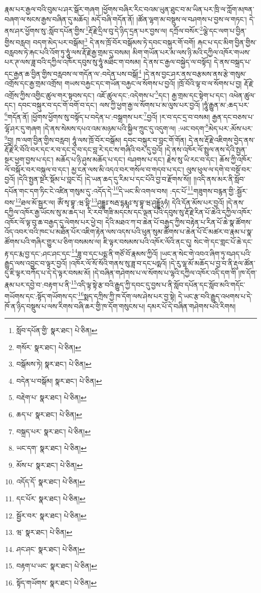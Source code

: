 རྣམ་པར་རྒྱལ་བའི་བུམ་པ་ཤར་སྒོར་གཞག །ཕྱོགས་བཞིར་རིང་བའམ་ཡུན་ཐུང་བ་མ་ཡིན་པར་ཁྲི་ལ་ཀློག་མཁན་བཞག་ལ་སངས་རྒྱས་བཞིན་དུ་མཆོད། མདོ་བཞི་གདོན་ནོ། །ཚོན་ལྷག་མ་བསྡུས་ལ་བཤགས་པ་བྱས་ལ་གཏང་། དེ་ནས་ཤར་ཕྱོགས་སུ་:སློབ་དཔོན་གྱིས་\footnote{སློབ་དཔོན་གྱི་  སྣར་ཐང་།  པེ་ཅིན། }རྡོ་རྗེ་དྲིལ་བུ་དེ་ཉིད་དྲན་པར་བྱས་ལ། དཀྲོལ་བསོར་\footnote{གསོར་  སྣར་ཐང་།  པེ་ཅིན། }ལྕེ་དང་ལག་པ་བྱིན་གྱིས་བརླབ། བདག་མེད་པར་བསྒོམ།\footnote{བསྒོམས་ཏེ།  སྣར་ཐང་།  པེ་ཅིན། } དེ་ནས་ཁྲོ་བོར་བསྒོམས་ཏེ་དབང་བསྐུར་གོ་བགོ། རྐང་པ་དང་མིག་བྱིན་གྱིས་བརླབས་ཏེ་རྐང་པའི་འོག་ཏུ་ཧཱུཾ་ལས་རྡོ་རྗེ་རྒྱ་གྲམ་དུ་བསམ། མིག་གཡོན་པར་མ་ལས་ཉི་མའི་དཀྱིལ་འཁོར་གཡས་པར་ཊ་ལས་ཟླ་བའི་དཀྱིལ་འཁོར་དབུས་སུ་ཧཱུཾ་མཐིང་ག་བསམ། དེ་ནས་ང་རྒྱལ་བསྐྱེད་ལ་བསྟོད། དེ་ནས་བསྐྲད་པ་དང་རྒྱན་ཆ་བྱིན་གྱིས་བརླབས་ལ་གདོན་ལ་:བདེན་པས་བསྒོ།\footnote{བདེན་པ་བསྒོམ།  སྣར་ཐང་།  པེ་ཅིན། } །དེ་ནས་བྱང་ཤར་ནས་བརྩམས་ནས་རྩེ་གསུམ་འགྲོས་དང་རྒྱ་གྲམ་འགྲོས། གཡས་བརྐྱང་དང་གཡོན་བརྐྱང་ལ་སོགས་པ་བྱའོ། །ཁྲོ་བོའི་ལྟ་བ་ལ་སོགས་པ་བྱ། རྡོ་རྗེ་འགྲོས་ཀྱིས་འགྱིང་ཚུལ་གར་སྟབས་དང་། འཇོ་ཚུལ་དང་:འདེགས་པ་\footnote{བརྡེག་པ་  སྣར་ཐང་།  པེ་ཅིན། }དང་། རྒྱ་གྲམ་དང་སྟེག་པ་དང་། འཕེན་ཚུལ་དང་། དབང་བསྐུར་བ་དང་གོ་བགོ་བ་དང་། ལས་ཀྱི་ཕྱག་རྒྱ་ལ་སོགས་པ་མ་ལུས་པར་བྱའོ། །ཧཱུཾ་རྒྱུན་མ་:ཆད་པར་\footnote{ཆད་པ་  སྣར་ཐང་།  པེ་ཅིན། }གདོན་ནོ། །ཕྱོགས་ཕྱོགས་སུ་བསྟོད་པ་བདེན་པ་:བསྒྲགས་པར་\footnote{བསྐྲད་པར་  སྣར་ཐང་།  པེ་ཅིན། }བྱའོ། །ར་བ་དང་དྲ་བ་བསམ། རྒྱན་དང་བཅས་པ་ལྷོ་ཤར་དུ་གཞག །དེ་ནས་སེམས་དཔའ་འམ་མཉམ་པའི་སྐྱིལ་ཀྲུང་དུ་འདུག་ལ། :ཡང་བདག་\footnote{ཡང་དག་  སྣར་ཐང་།  པེ་ཅིན། }མེད་པར་:མོས་པར་\footnote{མོས་པ་  སྣར་ཐང་།  པེ་ཅིན། }བྱ། ཁ་ལག་བྱིན་གྱིས་བརླབ། ཧཱུཾ་ལས་ཁྲོ་བོར་བསྒོམ། དབང་བསྐུར་བ་བླང་གོ་གོན། དེ་ནས་རྡོ་རྗེ་འཇིགས་བྱེད་ནས་རྡོ་རྗེ་རི་བོའི་བར་དང་ར་བ་དང་དྲ་བ་དང་བླ་རེ་དང་ས་གཞིའི་བར་དུ་བྱའོ། །དེ་ནས་འཁོར་ལོ་སྤྲུལ་ནས་དེའི་སྤྱན་སྔར་ཕྱག་བྱས་པ་དང་། མཆོད་པ་ཉི་ཤུས་མཆོད་པ་དང་། བཤགས་པ་དང་། རྗེས་སུ་ཡི་རང་བ་དང་། ཆོས་ཀྱི་འཁོར་ལོ་བསྐོར་བར་བསྐུལ་བ་དང་། མྱ་ངན་ལས་མི་འདའ་བར་གསོལ་བ་གདབ་པ་དང་། ལུས་ཕུལ་ལ་དགེ་བ་བསྔོ་བར་བྱའོ། །དེའི་སྤྱན་སྔར་སྡོམ་པ་བླང་ངོ། །དེ་ཡན་ཆད་དུ་རིམ་པ་དང་པོའི་བྱ་བ་རྫོགས་སོ།། །།འདི་ནས་མར་ནི་སློབ་དཔོན་གང་དག་ཏིང་ངེ་འཛིན་གསུམ་དུ་:འདོད་དེ་\footnote{འདོད་དོ་  སྣར་ཐང་།  པེ་ཅིན། }དེ་ཡང་མི་འགལ་བས། :དང་པོ་\footnote{དང་པོར་  སྣར་ཐང་།  པེ་ཅིན། }གཟུགས་བརྙན་གྱི་:སྦྱོར་བས་\footnote{སྦྱོར་བར་  སྣར་ཐང་།  པེ་ཅིན། }ཐལ་མོ་སྦྱར་ལ། ཨོཾ་སྭ་བྷཱ་:ཝ་བྷི་\footnote{ཝ་  སྣར་ཐང་།  པེ་ཅིན། }ཤུདྡྷཿ་སརྦ་དྷརྨཱཿ་སྭ་བྷཱ་ཝ་ཤུདྡྷོ྅ཧཾ། དེའི་དོན་མོས་པར་བྱའོ། །དེ་ནས་དཀྱིལ་འཁོར་རྒྱ་ཡོངས་སུ་མ་ཆད་པ། རི་རབ་གཟི་མདངས་དང་ལྡན་པའི་དབུས་སུ་རྡོ་རྗེ་རིན་པོ་ཆེའི་དཀྱིལ་འཁོར་འཁོར་ལོ་ལྟ་བུ་ཆ་བརྒྱད་དུ་ལེགས་པར་ཕྱེ་བ། དེའི་མཐའ་ཀ་བ་ཆེན་པོ་བརྒྱད་ཀྱིས་བརྟེན་པ་རིན་པོ་ཆེ་སྣ་ཚོགས་འོད་འབར་བའི་ཁང་པ་མཐོན་པོར་འཇིག་རྟེན་ལས་འདས་པའི་ཕུན་སུམ་ཚོགས་པ་ཆེན་པོ་ངོ་མཚར་བ་རྣམ་པ་སྣ་ཚོགས་པའི་གཞིར་གྱུར་པ་ཅིག་བསམས་ལ། ཇི་ལྟར་བསམས་པའི་འཁོར་ལོའི་ནང་དུ། སེང་གེ་དང་གླང་པོ་ཆེ་དང་རྟ་དང་རྨ་བྱ་དང་:ཤང་ཤང་དང་\footnote{ཤང་ཤང་  སྣར་ཐང་།  པེ་ཅིན། }ཟླ་བ་དང་པདྨ་ནི་གཙོ་བོ་རྣམས་ཀྱིའོ། །ཡང་ན་སེང་གེ་འབའ་ཞིག་ཏུ་བཤད་པའི་རྒྱུད་ལས་འབྱུང་བ་ལྟར་བྱའོ། །འཁོར་ལོ་སོ་སོའི་གནས་སུ་ཟླ་བ་དང་པདྨའོ། །དེ་རུ་ལྷ་མོ་མཆོད་པ་བྱ་བ་ནི་རྡུལ་ཚོན་དུ་ཇི་ལྟར་བཀོད་པ་དེ་དེ་ལྟར་བསམ་མོ། །དེ་བཞིན་གཤེགས་པ་ལ་སོགས་པ་ལྷའི་དཀྱིལ་འཁོར་འདི་དག་གི །ཁ་དོག་རྣམ་པར་དབྱེ་བ་:བརྟག་པ་ནི་\footnote{བརྟག་པ་ཡང་  སྣར་ཐང་།  པེ་ཅིན། }འདི་ལྟ་སྟེ་རྩ་བའི་རྒྱུད་ཀྱི་དབང་དུ་བྱས་པ་ནི་སློབ་དཔོན་དང་སློབ་མའི་གདོང་གཡོགས་དང་:སྟོད་གཡོགས་དང་\footnote{སྟོད་གཡོགས་  སྣར་ཐང་།  པེ་ཅིན། }སྨད་དཀྲིས་ཀྱི་ཁ་དོག་ལས་ཤེས་པར་བྱ་སྟེ། དེ་ཡང་རྩ་བའི་རྒྱུད་འཕགས་པ་དེ་ཁོ་ན་ཉིད་བསྡུས་པ་ལས་རིགས་བཞི་ཆར་གྱི་ཁ་དོག་གསུངས་པ། དམར་པོ་དེ་བཞིན་གཤེགས་པའི་རིགས། 